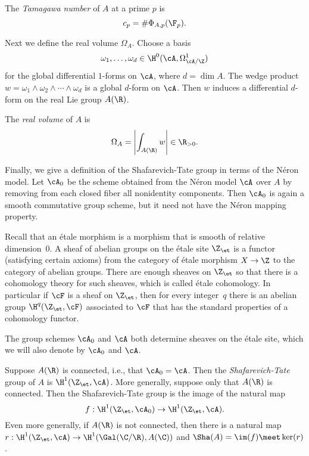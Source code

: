 \documentclass{report}
\begin{document}
\begin{definition}
The {\em Tamagawa number} of $A$ at a prime $p$ is
$$c_p = \#\Phi_{A,p}(\F_p).$$
\end{definition}

Next we define the real volume $\Omega_A$.  Choose a basis
\[\omega_1,\ldots,\omega_d \in \H^0(\cA,\Omega_{\cA/\Z}^1)\]
for the global differential $1$-forms on $\cA$, where $d=\dim A$.
The wedge product $w =
\omega_1\wedge\omega_2\wedge\cdots\wedge\omega_d$ is a global
$d$-form on $\cA$.  Then $w$ induces a differential $d$-form on
the real Lie group $A(\R)$.
\begin{definition}
The {\em real volume} of $A$ is
\[\Omega_A = \left| \int_{A(\R)} w\right|\in\R_{>0}.\]
\end{definition}

Finally, we give a definition of the Shafarevich-Tate group in
terms of the N\'eron model.  Let $\cA_0$ be the scheme obtained
from the N\'eron model $\cA$ over $A$ by removing from each closed
fiber all nonidentity components. Then $\cA_0$ is again a smooth
commutative group scheme, but it need not have the N\'eron mapping
property.

Recall that an \'etale morphism is a morphism that is smooth of
relative dimension~$0$.  A sheaf of abelian groups on the \'etale
site $\Z_{\et}$ is a functor (satisfying certain axioms) from the
category of \'etale morphism $X\to \Z$ to the category of abelian
groups.  There are enough sheaves on $\Z_{\et}$ so that there is a
cohomology theory for such sheaves, which is called \'etale
cohomology. In particular if $\cF$ is a sheaf on $\Z_{\et}$, then
for every integer~$q$ there is an abelian group
$\H^q(\Z_{\et},\cF)$ associated to $\cF$ that has the standard
properties of a cohomology functor.

The group schemes $\cA_0$ and $\cA$ both determine sheaves on the
\'etale site, which we will also denote by $\cA_0$ and $\cA$.

\begin{definition}
Suppose $A(\R)$ is connected, i.e., that $\cA_0=\cA$.  Then the {\em
Shafarevich-Tate} group of $A$ is $\H^1(\Z_{\et},\cA)$.  More
generally, suppose only that $A(\R)$ is connected.  Then the
Shafarevich-Tate group is the image of the natural map
\[
  f:\H^1(\Z_{\et}, \cA_0) \to \H^1(\Z_{\et},\cA).
\]
Even more generally, if $A(\R)$ is not connected, then there is a
natural map $r:\H^1(\Z_{\et},\cA)\to \H^1(\Gal(\C/\R),A(\C))$ and
$\Sha(A)=\im(f)\meet \ker(r)$.
\end{definition}
\end{document}
